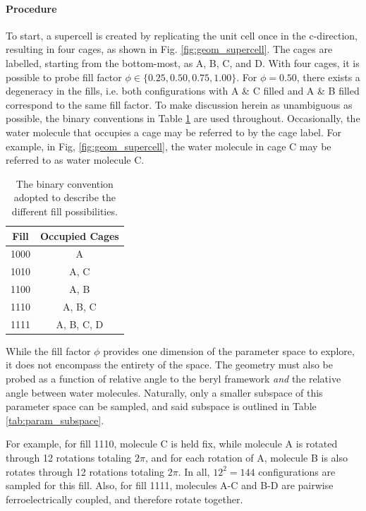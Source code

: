     \paragraph{Procedure} To start, a supercell is created by replicating the unit cell once in the c-direction, resulting in four cages, as shown in Fig. \ref{fig:geom_supercell}. The cages are labelled, starting from the bottom-most, as A, B, C, and D. With four cages, it is possible to probe fill factor $\phi \in \{0.25,0.50,0.75,1.00 \}$. For $\phi=0.50$, there exists a degeneracy in the fills, i.e. both configurations with A \& C filled and A \& B filled correspond to the same fill factor. To make discussion herein as unambiguous as possible, the binary conventions in Table \ref{tab:fill_conventions} are used throughout. Occasionally, the water molecule that occupies a cage may be referred to by the cage label. For example, in Fig, \ref{fig:geom_supercell}, the water molecule in cage C may be referred to as water molecule C. 
    
    \begin{table}[]
        \centering
        \begin{tabular}{c|c}
           Fill  & Occupied Cages \\
           \hline
           \hline
           1000  &  A \\
           1010  &  A, C \\
           1100  &  A, B \\
           1110  &  A, B, C \\
           1111  &  A, B, C, D\\
        \end{tabular}
        \caption{The binary convention adopted to describe the different fill possibilities.}
        \label{tab:fill_conventions}
    \end{table}
    
    While the fill factor $\phi$ provides one dimension of the parameter space to explore, it does not encompass the entirety of the space. The geometry must also be probed as a function of relative angle to the beryl framework \textit{and} the relative angle between water molecules. Naturally, only a smaller subspace of this parameter space can be sampled, and said subspace is outlined in Table \ref{tab:param_subspace}.
    
    For example, for fill 1110, molecule C is held fix, while molecule A is rotated through 12 rotations totaling $2\pi$, and for each rotation of A, molecule B is also rotates through 12 rotations totaling $2\pi$. In all, $12^2 = 144$ configurations are sampled for this fill. Also, for fill 1111, molecules A-C and B-D are pairwise ferroelectrically coupled, and therefore rotate together. 
    

